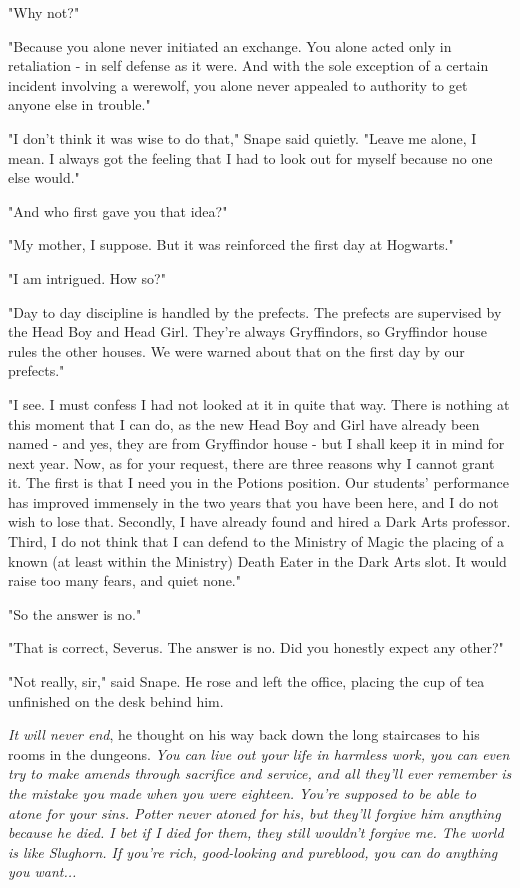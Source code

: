 \documentclass[a4paper,11pt]{article}
\begin{document}
"Why not?"

"Because you alone never initiated an exchange. You alone acted only in retaliation - in self defense as it were. And with the sole exception of a certain incident involving a werewolf, you alone never appealed to authority to get anyone else in trouble."

"I don't think it was wise to do that," Snape said quietly. "Leave me alone, I mean. I always got the feeling that I had to look out for myself because no one else would."

"And who first gave you that idea?"

"My mother, I suppose. But it was reinforced the first day at Hogwarts."

"I am intrigued. How so?"

"Day to day discipline is handled by the prefects. The prefects are supervised by the Head Boy and Head Girl. They're always Gryffindors, so Gryffindor house rules the other houses. We were warned about that on the first day by our prefects."

"I see. I must confess I had not looked at it in quite that way. There is nothing at this moment that I can do, as the new Head Boy and Girl have already been named - and yes, they are from Gryffindor house - but I shall keep it in mind for next year. Now, as for your request, there are three reasons why I cannot grant it. The first is that I need you in the Potions position. Our students' performance has improved immensely in the two years that you have been here, and I do not wish to lose that. Secondly, I have already found and hired a Dark Arts professor. Third, I do not think that I can defend to the Ministry of Magic the placing of a known (at least within the Ministry) Death Eater in the Dark Arts slot. It would raise too many fears, and quiet none."

"So the answer is no."

"That is correct, Severus. The answer is no. Did you honestly expect any other?"

"Not really, sir," said Snape. He rose and left the office, placing the cup of tea unfinished on the desk behind him.

\emph{It will never end}, he thought on his way back down the long staircases to his rooms in the dungeons. \emph{You can live out your life in harmless work, you can even try to make amends through sacrifice and service, and all they'll ever remember is the mistake you made when you were eighteen. You're supposed to be able to atone for your sins. Potter never atoned for his, but they'll forgive him anything because he died. I bet if I died for them, they still wouldn't forgive me. The world is like Slughorn. If you're rich, good-looking and pureblood, you can do anything you want...}
\end{document}
